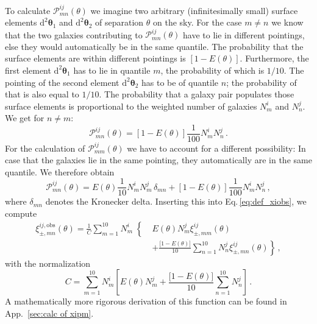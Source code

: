 \documentclass{aa}
\renewcommand{\rm}{\mathrm}
\def\b#1{\bm{#1}}
\def\d{\rm{d}}
\begin{document}
To calculate $\mathcal{P}_{mn}^{ij}(\theta)$ we imagine two arbitrary (infinitesimally small) surface elements $\d^2\b\theta_1$ and $\d^2\b\theta_2$ of separation $\theta$ on the sky. For the case $m\neq n$ we know that the two galaxies contributing to $\mathcal{P}_{mn}^{ij}(\theta)$ have to lie in different pointings, else they would automatically be in the same quantile. The probability that the surface elements are within different pointings is $[1-E(\theta)]$. Furthermore, the first element $\d^2\b\theta_1$ has to lie in quantile $m$, the probability of which is $1/10$. The pointing of the second element $\d^2\b\theta_2$ has to be of quantile $n$; the probability of that is also equal to $1/10$. The probability that a galaxy pair populates those surface elements is proportional to the weighted number of galaxies $N_m^i$ and $N_n^j$. We get for $n\neq m$: \begin{equation}
\mathcal{P}_{mn}^{ij}(\theta) = [1-E(\theta)]\frac{1}{100} N_m^i N_n^j\, .
\label{eq:pmnij_corr1}
\end{equation}
For the calculation of $\mathcal{P}_{mm}^{ij}(\theta)$ we have to account for a different possibility: In case that the galaxies lie in the same pointing, they automatically are in the same quantile. We therefore obtain \begin{equation}
\mathcal{P}_{mn}^{ij}(\theta) = E(\theta)\frac{1}{10} N_m^iN_m^j\,\delta_{mn} + [1-E(\theta)]\frac{1}{100} N_m^i N_n^j \, ,
\label{eq:pmnij_uncorr}
\end{equation}
where $\delta_{mn}$ denotes the Kronecker delta.
Inserting this into Eq.\,\eqref{eq:def_xiobs}, we compute
\begin{align}
\xi_{\pm,mn}^{ij,\rm{obs}}(\theta) =  \left.\frac{1}{C}\sum_{m=1}^{10} N_m^i \right\{ & E(\theta) N_m^j \xi_{\pm,mm}^{ij}(\theta) \nonumber\\
 & \left. + \frac{\big[1-E(\theta)\big]}{10}\sum_{n=1}^{10}N_n^j \xi_{\pm,mn}^{ij}(\theta)\right\}\, ,
\label{eq:correctionfunction1}
\end{align}
with the normalization
\begin{equation}
C = \sum_{m=1}^{10} N_m^i \left[ E(\theta)  N_m^j + \frac{\big[1-E(\theta)\big]}{10}\sum_{n=1}^{10} N_n^j\right]\, .
\end{equation}
A mathematically more rigorous derivation of this function can be found in App.~\ref{sec:calc of xipm}.
\end{document}
